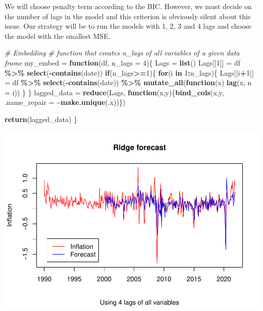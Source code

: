 \documentclass[
]{article}
\newenvironment{Shaded}{\begin{snugshade}}{\end{snugshade}}
\newcommand{\AttributeTok}[1]{\textcolor[rgb]{0.13,0.29,0.53}{#1}}
\newcommand{\CommentTok}[1]{\textcolor[rgb]{0.56,0.35,0.01}{\textit{#1}}}
\newcommand{\ControlFlowTok}[1]{\textcolor[rgb]{0.13,0.29,0.53}{\textbf{#1}}}
\newcommand{\DecValTok}[1]{\textcolor[rgb]{0.00,0.00,0.81}{#1}}
\newcommand{\FunctionTok}[1]{\textcolor[rgb]{0.13,0.29,0.53}{\textbf{#1}}}
\newcommand{\NormalTok}[1]{#1}
\newcommand{\OtherTok}[1]{\textcolor[rgb]{0.56,0.35,0.01}{#1}}
\newcommand{\SpecialCharTok}[1]{\textcolor[rgb]{0.81,0.36,0.00}{\textbf{#1}}}
\newcommand{\StringTok}[1]{\textcolor[rgb]{0.31,0.60,0.02}{#1}}
\begin{document}
We will choose penalty term according to the BIC. However, we must
decide on the number of lags in the model and this criterion is
obviously silent about this issue. Our strategy will be to run the
models with 1, 2, 3 and 4 lags and choose the model with the smallest
MSE.

\begin{Shaded}
\begin{Highlighting}[]
\CommentTok{\# Embedding}
\CommentTok{\# function that creates n\_lags of all variables of a given data frame}
\NormalTok{my\_embed }\OtherTok{=} \ControlFlowTok{function}\NormalTok{(df, }\AttributeTok{n\_lags =} \DecValTok{4}\NormalTok{)\{}
\NormalTok{Lags }\OtherTok{=} \FunctionTok{list}\NormalTok{()}
\NormalTok{Lags[[}\DecValTok{1}\NormalTok{]] }\OtherTok{=}\NormalTok{ df }\SpecialCharTok{\%\textgreater{}\%} \FunctionTok{select}\NormalTok{(}\SpecialCharTok{{-}}\FunctionTok{contains}\NormalTok{(}\StringTok{\textquotesingle{}date\textquotesingle{}}\NormalTok{))}
\ControlFlowTok{if}\NormalTok{(n\_lags}\SpecialCharTok{\textgreater{}=}\DecValTok{1}\NormalTok{)\{}
  \ControlFlowTok{for}\NormalTok{(i }\ControlFlowTok{in} \DecValTok{1}\SpecialCharTok{:}\NormalTok{n\_lags)\{}
\NormalTok{    Lags[[i}\SpecialCharTok{+}\DecValTok{1}\NormalTok{]] }\OtherTok{=}\NormalTok{ df }\SpecialCharTok{\%\textgreater{}\%} \FunctionTok{select}\NormalTok{(}\SpecialCharTok{{-}}\FunctionTok{contains}\NormalTok{(}\StringTok{\textquotesingle{}date\textquotesingle{}}\NormalTok{)) }\SpecialCharTok{\%\textgreater{}\%} 
      \FunctionTok{mutate\_all}\NormalTok{(}\ControlFlowTok{function}\NormalTok{(x) }\FunctionTok{lag}\NormalTok{(x, }\AttributeTok{n =}\NormalTok{ i))}
\NormalTok{  \}}
\NormalTok{\}}
\NormalTok{lagged\_data }\OtherTok{=} \FunctionTok{reduce}\NormalTok{(Lags, }\ControlFlowTok{function}\NormalTok{(x,y)\{}\FunctionTok{bind\_cols}\NormalTok{(x,y, }\AttributeTok{.name\_repair =} \SpecialCharTok{\textasciitilde{}}\FunctionTok{make.unique}\NormalTok{(.x))\}) }

\FunctionTok{return}\NormalTok{(lagged\_data)}
\NormalTok{\}}
\end{Highlighting}
\end{Shaded}

\includegraphics{Trabalho_Econo4_Q2_files/figure-latex/unnamed-chunk-19-1.pdf}
\end{document}
